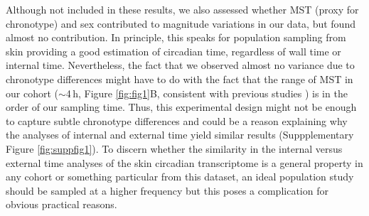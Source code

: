 Although not included in these results, we also assessed whether MST (proxy for chronotype) and sex contributed to magnitude variations in our data, but found almost no contribution. In principle, this speaks for population sampling from skin providing a good estimation of circadian time, regardless of wall time or internal time. Nevertheless, the fact that we observed almost no variance due to chronotype differences might have to do with the fact that the range of MST in our cohort ($\sim$4\,h, Figure \ref{fig:fig1}B, consistent with previous studies \cite{Roenneberg2007}) is in the order of our sampling time. Thus, this experimental design might not be enough to capture subtle chronotype differences and could be a reason explaining why the analyses of internal and external time yield similar results (Suppplementary Figure \ref{fig:suppfig1}). To discern whether the similarity in the internal versus external time analyses of the skin circadian transcriptome is a general property in any cohort or something particular from this dataset, an ideal population study should be sampled at a higher frequency but this poses a complication for obvious practical reasons. \\%

